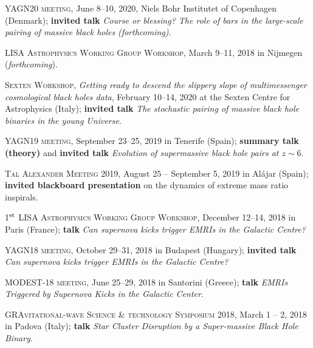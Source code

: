 \begin{etaremune}

    \item \textsc{YAGN20 meeting}, June 8--10, 2020, Niels Bohr Institutet of Copenhagen (Denmark);  {\bf invited talk}  \textit{Course or blessing? The role of bars in the large-scale pairing of massive black holes}
    \textit{(forthcoming)}.
    
        \item \textsc{LISA Astrophysics Working Group Workshop}, March 9--11, 2018 in  Nijmegen (\textit{forthcoming}).
    
    \item \textsc{Sexten Workshop}, \textit{Getting ready to descend the slippery slope of multimessenger cosmological black holes data}, February 10--14, 2020 at the Sexten Centre for Astrophysics (Italy);  {\bf invited talk} \textit{The stochastic pairing of massive black hole binaries in the young Universe}.

    \item \textsc{YAGN19 meeting}, September 23--25, 2019 in  Tenerife (Spain); \textbf{summary talk (theory)} and {\bf invited talk}  {\it Evolution of supermassive black hole pairs at $z\sim 6$}.

    \item \textsc{Tal Alexander Meeting 2019,}%
     August 25 -- September 5, 2019 in Al\'ajar (Spain); {\bf invited blackboard presentation} on the dynamics of extreme mass ratio inspirals.

    \item \textsc{1$^{\rm st}$ LISA Astrophysics Working Group Workshop}, December 12--14, 2018 in  Paris (France); 
 {\bf talk} {\it Can supernova kicks trigger EMRIs in the Galactic Centre?}

    \item \textsc{YAGN18 meeting}, October 29--31, 2018 in  Budapest (Hungary); {\bf invited talk} {\it Can supernova kicks trigger EMRIs in the Galactic Centre?}

    \item \textsc{MODEST-18 meeting}, June 25--29, 2018 in Santorini (Greece); {\bf talk} {\it  EMRIs Triggered by Supernova Kicks in the Galactic Center}.

    \item \textsc{GRAvitational-wave Science \& technology Symposium 2018,} March 1 -- 2, 2018  in Padova (Italy);  {\bf talk} {\it Star Cluster Disruption by a Super-massive Black Hole Binary}.



\end{etaremune}
